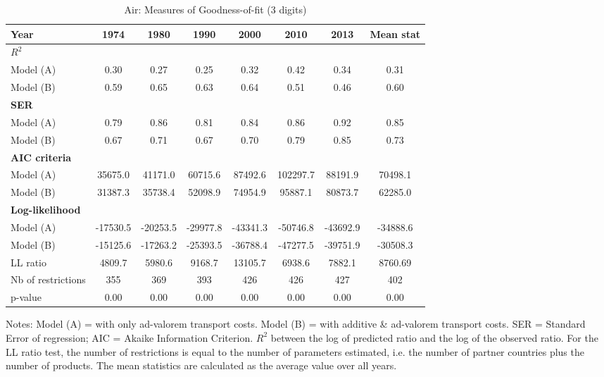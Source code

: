 \documentclass[a4paper,11pt]{article}
\begin{document}
\begin{table}[htbp]
  \centering
  \caption{Air: Measures of Goodness-of-fit (3 digits)}
  \footnotesize{
\begin{center}
    \begin{tabular}{l|cccccc|c}
    \hline \hline
    Year  & 1974  & 1980  & 1990  & 2000  & \multicolumn{1}{c}{2010} & \multicolumn{1}{c}{2013} & Mean stat \\ \hline
    \multicolumn{8}{l}{\textbf{$R^2$} }\\ \hline
    Model (A)& 0.30  & 0.27  & 0.25  & 0.32  & \multicolumn{1}{c}{0.42} & \multicolumn{1}{c}{0.34} & 0.31 \\
    Model (B) & 0.59  & 0.65  & 0.63  & 0.64  & \multicolumn{1}{c}{0.51} & \multicolumn{1}{c}{0.46} & 0.60 \\ \hline
    \multicolumn{8}{l}{\textbf{SER}  }  \\ \hline
     Model (A) & 0.79  & 0.86  & 0.81  & 0.84  & \multicolumn{1}{c}{0.86} & \multicolumn{1}{c}{0.92} & 0.85 \\
    Model (B) & 0.67  & 0.71  & 0.67  & 0.70  & \multicolumn{1}{c}{0.79} & \multicolumn{1}{c}{0.85} & 0.73 \\ \hline
   \multicolumn{8}{l}{\textbf{AIC criteria}}  \\ \hline
    Model (A) & 35675.0 & 41171.0 & 60715.6 & 87492.6 & \multicolumn{1}{c}{102297.7} & \multicolumn{1}{c}{88191.9} & 70498.1 \\
    Model (B)  & 31387.3 & 35738.4 & 52098.9 & 74954.9 & \multicolumn{1}{c}{95887.1} & \multicolumn{1}{c}{80873.7} & 62285.0 \\ \hline
    \multicolumn{8}{l}{\textbf{Log-likelihood}} \\ \hline
    Model (A) & -17530.5 & -20253.5 & -29977.8 & -43341.3 & \multicolumn{1}{c}{-50746.8} & \multicolumn{1}{c}{-43692.9} & -34888.6 \\
    Model (B) & -15125.6 & -17263.2 & -25393.5 & -36788.4 & \multicolumn{1}{c}{-47277.5} & \multicolumn{1}{c}{-39751.9} & -30508.3 \\
    LL ratio & 4809.7 & 5980.6 & 9168.7 & 13105.7 & \multicolumn{1}{c}{6938.6} & \multicolumn{1}{c}{7882.1} & 8760.69 \\
    Nb of restrictions & 355   & 369   & 393   & 426   & \multicolumn{1}{c}{426} & \multicolumn{1}{c}{427} & 402 \\
    p-value & 0.00 & 0.00 & 0.00 & 0.00 & \multicolumn{1}{c}{0.00} & \multicolumn{1}{c}{0.00} & 0.00 \\
    \hline \hline
 \end{tabular}%
    \end{center}}
  \label{tab:good_fit_air}%
 \parbox[l]{15cm}{\footnotesize{Notes: Model (A) = with only ad-valorem transport costs.
Model (B) = with additive \& ad-valorem transport costs.
SER = Standard Error of regression; AIC = Akaike Information Criterion.
$R^{2}$ between the log of predicted ratio and the log of the observed ratio.
For the LL ratio test, the number of restrictions is equal to the number of parameters estimated, i.e. the number of partner countries plus the number of products.
The mean statistics are calculated as the average value over all years.
}}
\end{table}%
\end{document}

